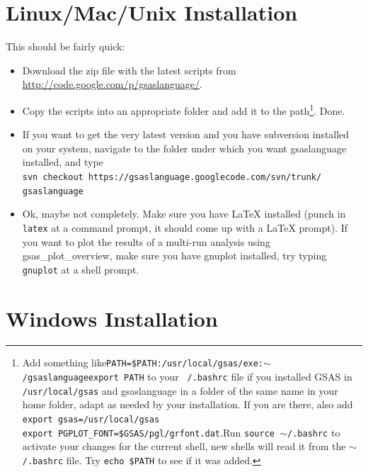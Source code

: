 \section{Linux/Mac/Unix Installation}
This should be fairly quick:
\begin{itemize}
\item Download the zip file with the latest scripts from \url{http://code.google.com/p/gsaslanguage/}. 
\item Copy the scripts into an appropriate folder and add it to the path\footnote{Add something like\newline \texttt{PATH=\$PATH:/usr/local/gsas/exe:$\sim$/gsaslanguage\newline export PATH\newline} to your \texttt{~/.bashrc} file if you installed GSAS in \texttt{/usr/local/gsas} and gsaslanguage in a folder of the same name in your home folder, adapt as needed by your installation. If you are there, also add \texttt{\\export gsas=/usr/local/gsas \\export PGPLOT\_FONT=\$GSAS/pgl/grfont.dat}.Run \texttt{source $\sim$/.bashrc} to activate your changes for the current shell, new shells will read it from the \texttt{$\sim$/.bashrc} file. Try \texttt{echo \$PATH} to see if it was added.}. Done.
\item If you want to get the very latest version and you have subversion
installed on your system, navigate to the folder under which you want
gsaslanguage installed, and type\\
\texttt{svn checkout https://gsaslanguage.googlecode.com/svn/trunk/
gsaslanguage}
\item Ok, maybe not completely. Make sure you have \LaTeX{}  installed (punch in \texttt{latex} at a command prompt, it should come up with a \LaTeX{}  prompt). If you want to plot the results of a multi-run analysis using gsas\_plot\_overview, make sure you have gnuplot installed, try typing \texttt{gnuplot} at a shell prompt.
\end{itemize}

\section{Windows Installation}

